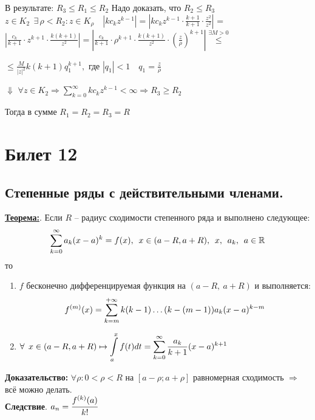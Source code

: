 \documentclass[a4paper,12pt]{article} %
\begin{document}
В результате: $R_3 \leqslant R_1 \leqslant R_2 $
Надо доказать, что $R_2 \leqslant R_3$
$z \in K_2 \ \  \exists \, \rho < R_2: z \in K_{\rho} \quad |k c_k z^{k - 1}| = |k c_k z^{k - 1} \cdot \frac{k + 1}{k + 1} \cdot \frac{z^2}{z^2}|$ = 
$|\frac{c_k}{k + 1} \cdot z^{k + 1} \cdot \frac{k(k+1)}{z^2}| = | \frac{c_k}{k + 1} \cdot \rho^{k + 1} \cdot \frac{k(k + 1)}{z^2} \cdot \left( \frac{z}{\rho} \right)^{k + 1}| \stackrel{\exists M > 0}{\leqslant} $

$\leqslant \frac{M}{|z|^2} k(k+1) q_1^{k + 1}, \text{ где } |q_1| < 1 \quad q_1 = \frac{z}{\rho}$

\hspace*{3 cm} $\Downarrow$
$\forall z \in K_2 \Rightarrow \sum\limits_{k = 0}^\infty k c_k z^{k - 1} < \infty \Rightarrow R_3 \geqslant R_2$

Тогда в сумме $R_1 = R_2 = R_3 = R$

\newpage
\section{Билет 12}
\subsection{Степенные ряды с действительными членами.}
\underline{\textbf{Теорема:}}. Если $R$ -- радиус сходимости степенного ряда и выполнено следующее:
\begin{equation*}
\Large \displaystyle \sum\limits_{k = 0}^{\infty} a_k(x-a)^k = f(x),\ x\in (a - R, a + R),\ x,~a_k,~a \in \mathbb{R}
\end{equation*}
то
\begin{enumerate}
\item $f$ бесконечно дифференцируемая функция на $(a-R,~a+R)$ и  выполняется: 
\begin{equation*}
	\Large \displaystyle f^{(m)}(x) = \sum\limits_{k = m}^{+\infty} k(k-1)\dots (k - (m-1))a_k(x-a)^{k-m}
\end{equation*}
\item $\Large \displaystyle \forall\ x \in (a - R, a + R) \mapsto \int\limits_{a}^{x} f(t)dt = \sum\limits_{k = 0}^{\infty} \frac{a_k}{k+1}(x-a)^{k+1}$ 
\end{enumerate} 
\textbf{Доказательство:}
$\forall \rho: 0 < \rho < R  \text{ на } [a - \rho; a + \rho ]$ равномерная сходимость $\Rightarrow$ всё можно делать.\\
\textbf{Следствие}. $a_n = \cfrac{f^{(k)}(a)}{k!}$
\end{document}

